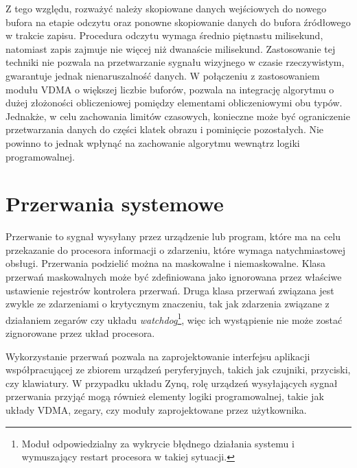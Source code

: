 Z tego względu, rozważyć należy skopiowane danych wejściowych do nowego bufora na etapie odczytu oraz ponowne skopiowanie danych do bufora źródłowego w trakcie zapisu. 
Procedura odczytu wymaga średnio piętnastu milisekund, natomiast zapis zajmuje nie więcej niż dwanaście milisekund. %
Zastosowanie tej techniki nie pozwala na przetwarzanie sygnału wizyjnego w czasie rzeczywistym, gwarantuje jednak nienaruszalność danych. 
W połączeniu z zastosowaniem modułu VDMA o większej liczbie buforów, pozwala na integrację algorytmu o dużej złożoności obliczeniowej pomiędzy elementami obliczeniowymi obu typów. Jednakże, w celu zachowania limitów czasowych, konieczne może być ograniczenie przetwarzania danych do części klatek obrazu i pominięcie pozostałych. Nie powinno to jednak wpłynąć na zachowanie algorytmu wewnątrz logiki programowalnej. %


\section{Przerwania systemowe}
\label{sec:axi-interrupts}

Przerwanie to sygnał wysyłany przez urządzenie lub program, które ma na celu przekazanie do procesora informacji o zdarzeniu, które wymaga natychmiastowej obsługi.
Przerwania podzielić można na maskowalne i niemaskowalne. 
Klasa przerwań maskowalnych może być zdefiniowana jako ignorowana przez właściwe ustawienie rejestrów kontrolera przerwań. 
Druga klasa przerwań związana jest zwykle ze zdarzeniami o krytycznym znaczeniu, tak jak zdarzenia związane z działaniem zegarów czy układu \emph{watchdog}\footnote{Moduł odpowiedzialny za wykrycie błędnego działania systemu i wymuszający restart procesora w takiej sytuacji.}, więc ich wystąpienie nie może zostać zignorowane przez układ procesora. %

Wykorzystanie przerwań pozwala na zaprojektowanie interfejsu aplikacji współpracującej ze zbiorem urządzeń peryferyjnych, takich jak czujniki, przyciski, czy klawiatury. 
W przypadku układu Zynq, rolę urządzeń wysyłających sygnał przerwania przyjąć mogą również elementy logiki programowalnej, takie jak układy VDMA, zegary, czy moduły zaprojektowane przez użytkownika. %

